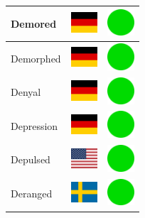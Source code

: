 \documentclass[12pt, a4paper, twoside]{report}
\begin{document}
\begin{center}
\begin{longtable}{|p{5cm}|p{2cm}|p{2cm}|}
Demored & \includegraphics[width=1cm]{4x3/de} & \includegraphics[width=1cm]{likes/y} \\ \hline
Demorphed & \includegraphics[width=1cm]{4x3/de} & \includegraphics[width=1cm]{likes/y} \\ \hline
Denyal & \includegraphics[width=1cm]{4x3/de} & \includegraphics[width=1cm]{likes/y} \\ \hline
Depression & \includegraphics[width=1cm]{4x3/de} & \includegraphics[width=1cm]{likes/y} \\ \hline
Depulsed & \includegraphics[width=1cm]{4x3/us} & \includegraphics[width=1cm]{likes/y} \\ \hline
Deranged & \includegraphics[width=1cm]{4x3/se} & \includegraphics[width=1cm]{likes/y} \\ \hline

\end{longtable}
\end{center}
\end{document}
